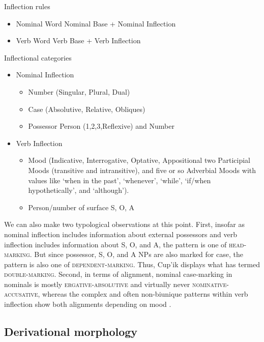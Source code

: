 \documentclass[output=paper]{langscibook}
\begin{document}
\ea\label{ex:key:6} 
{Inflection rules}\\
\begin{itemize}
\item 
Nominal Word \MVRightarrow{} Nominal Base + Nominal Inflection
\item 
Verb Word \MVRightarrow{} Verb Base + Verb Inflection
\end{itemize}
\z

\ea\label{ex:key:7} 
{Inflectional categories}\\
\begin{itemize}
\item 
Nominal Inflection
    \begin{itemize}
    \item 
    Number (Singular, Plural, Dual)
    \item 
    Case (Absolutive, Relative, Obliques)
    \item 
    Possessor Person (1,2,3,Reflexive) and Number
    \end{itemize}
\item 
Verb Inflection
    \begin{itemize}
    \item 
    Mood (Indicative, Interrogative, Optative, Appositional two Participial Moods (transitive and intransitive), and five or so Adverbial Moods with values like `when in the past', `whenever', `while', `if/when hypothetically', and `although').
    \item 
    Person/number of surface S, O, A
    \end{itemize}
\end{itemize}
\z

We can also make two typological observations at this point. First, insofar as nominal inflection includes information about external possessors and verb inflection includes information about S, O, and A, the pattern is one of \textsc{head-marking.} But since possessor, S, O, and A NPs are also marked for case, the pattern is also one of \textsc{dependent-marking.} Thus, Cup'ik displays what \citet{Nichols1986} has termed \textsc{double-marking.} Second, in terms of alignment, nominal case-marking in nominals is mostly \textsc{ergative-absolutive} and virtually never \textsc{nominative-accusative}, whereas the complex and often non-biunique patterns within verb inflection show both alignments depending on mood \citep[141--189]{Woodbury1981}.

\subsection{Derivational morphology} \label{sec:3.2}
\end{document}

